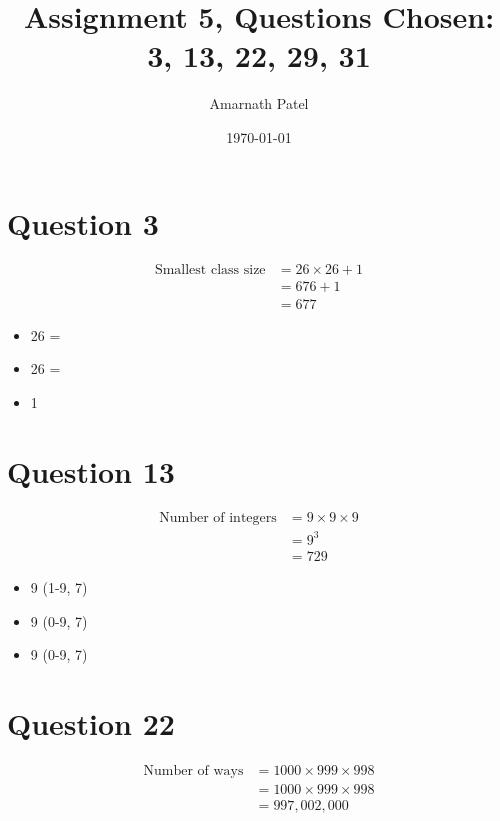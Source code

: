 \documentclass{article}
\begin{document}
\title{Assignment 5, Questions Chosen: 3, 13, 22, 29, 31}
\author{Amarnath Patel}
\date{\today}


\maketitle

\section{Question 3}
\begin{align*}
    \text{Smallest class size} &= 26 \times 26 + 1 \\
    &= 676 + 1 \\
    &= 677
    \end{align*}
    
    \begin{itemize}
        \item 26 = 
        \item 26 = 
        \item 1 
    \end{itemize}

\section{Question 13}
\begin{align*}
    \text{Number of integers} &= 9 \times 9 \times 9 \\
    &= 9^3 \\
    &= 729
    \end{align*}
    
    \begin{itemize}
        \item 9  (1-9,  7)
        \item 9  (0-9,  7)
        \item 9  (0-9,  7)
    \end{itemize}

\section{Question 22}
\begin{align*}
    \text{Number of ways} &= 1000 \times 999 \times 998 \\
    &= 1000 \times 999 \times 998 \\
    &= 997,002,000
    \end{align*}
    
\end{document}
